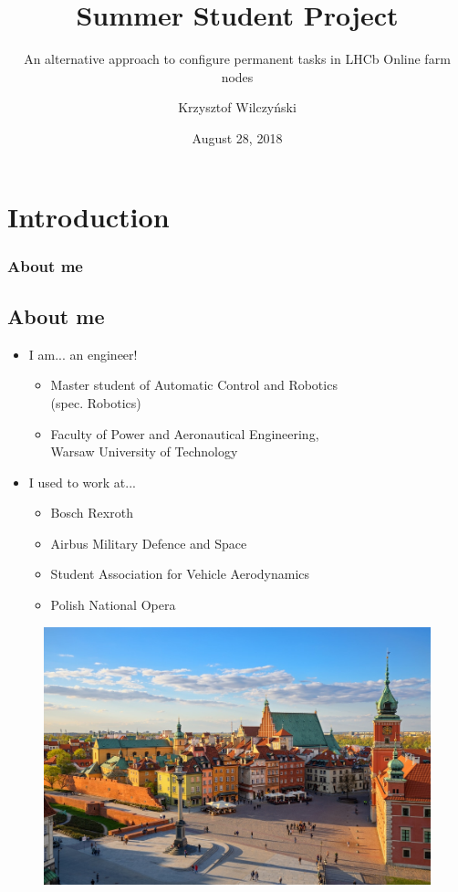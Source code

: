 \documentclass{beamer}
\title{Summer Student Project}
\subtitle{An alternative approach to configure permanent tasks in LHCb Online farm nodes}
\author{Krzysztof Wilczyński}
\date{August 28, 2018}
\institute{Supervisors: Markus Frank, Beat Jost}
\begin{document}
\begin{frame}[plain,t]
\titlepage
\end{frame}


\section{Introduction}
\begin{frame}
\frametitle{About me}
\subsection{About me}

\begin{center}
\begin{itemize}
\item I am... an engineer!
	\begin{itemize}
	\item Master student of Automatic Control and Robotics\\ 			(spec. Robotics)
	\item Faculty of Power and Aeronautical Engineering, \\
    	Warsaw University of Technology
	\end{itemize}
\end{itemize}
\end{center}

\noindent\begin{minipage}{0.5\textwidth}
\begin{itemize}
\item I used to work at...
	\begin{itemize}
	\item Bosch Rexroth
	\item Airbus Military Defence and Space
    \item Student Association for Vehicle Aerodynamics
    \item Polish National Opera
	\end{itemize}
\end{itemize}
\end{minipage}%
\hfill%
\begin{minipage}{0.5\textwidth}\raggedleft
\begin{figure}
\includegraphics[scale=0.13]{images/warsaw2}
\end{figure}
\end{minipage}



\end{frame}
\end{document}
